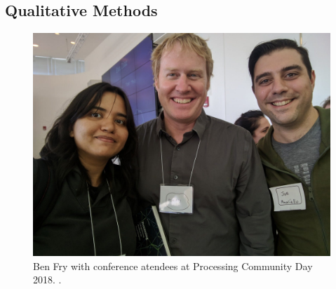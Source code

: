 











\subsection{Qualitative Methods}
\begin{figure}[H]
  \begin{minipage}{\textwidth}
    \includegraphics[width=\linewidth]{images/pcd2018.jpg}
    \caption[Ben Fry at PCD 2018]{Ben Fry with conference atendees at Processing Community Day 2018. .}
    \label{fig:benFry}
    
  \end{minipage}
\end{figure}

